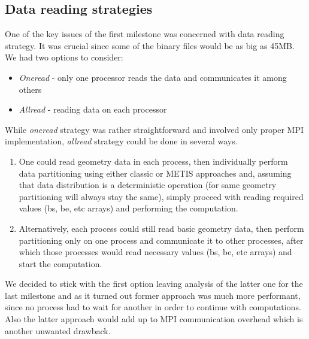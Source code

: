 \documentclass{article}
\begin{document}
\subsection{Data reading strategies}
One of the key issues of the first milestone was concerned with data reading strategy. It was crucial since some of the binary files would be as big as 45MB. We had two options to consider:
\begin{itemize}
	\item \textit{Oneread} - only one processor reads the data and communicates it among others
	\item \textit{Allread} - reading data on each processor
\end{itemize}
While \textit{oneread} strategy was rather straightforward and involved only proper MPI implementation, \textit{allread} strategy could be done in several ways. 
\begin{enumerate}
	\item One could read geometry data in each process, then individually perform data partitioning using either classic or METIS approaches and, assuming that data distribution is a deterministic operation (for same geometry partitioning will always stay the same), simply proceed with reading required values (bs, be, etc arrays) and performing the computation.
	\item Alternatively, each process could still read basic geometry data, then perform partitioning only on one process and communicate it to other processes, after which those processes would read necessary values (bs, be, etc arrays) and start the computation.
\end{enumerate}
We decided to stick with the first option leaving analysis of the latter one for the last milestone and as it turned out former approach was much more performant, since no process had to wait for another in order to continue with computations. Also the latter approach would add up to MPI communication overhead which is another unwanted drawback.
\end{document}
